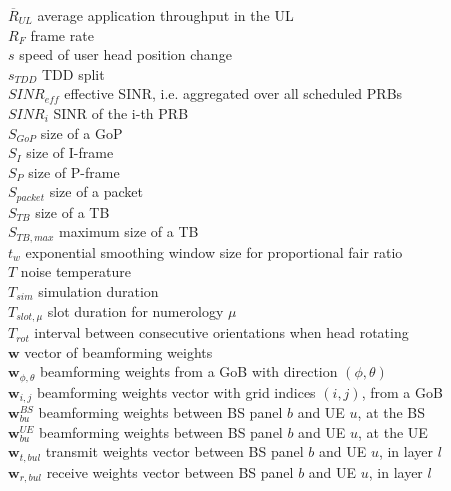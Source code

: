 $\overline{R}_{UL}$ \mytab average application throughput in the \acs{UL}\\
$R_F$ \mytab frame rate \\
$s$ \mytab speed of user head position change \\
$s_{TDD}$ \mytab \acs{TDD} split \\
$SINR_{eff}$ \mytab effective \acs{SINR}, i.e. aggregated over all scheduled PRBs \\
$SINR_i$ \mytab SINR of the i-th \acs{PRB} \\
$S_{GoP}$ \mytab size of a \acs{GoP}\\
$S_I$ \mytab size of I-frame\\
$S_P$ \mytab size of P-frame\\
$S_{packet}$ \mytab size of a packet\\
$S_{TB}$ \mytab size of a \acs{TB}\\
$S_{TB, max}$ \mytab maximum size of a \acs{TB}\\
$t_w$ \mytab exponential smoothing window size for proportional fair ratio \\
$T$ \mytab noise temperature\\
$T_{sim}$ \mytab simulation duration\\
$T_{slot, \mu}$ \mytab slot duration for numerology $\mu$\\
$T_{rot}$ \mytab interval between consecutive orientations when head rotating\\
$\bm{w}$ \mytab vector of beamforming weights \\
$\bm{w}_{\phi, \theta}$ \mytab beamforming weights from a GoB with direction $(\phi, \theta)$ \\
$\bm{w}_{i,j}$ \mytab beamforming weights vector with grid indices $(i,j)$, from a GoB\\
$\bm{w}^{BS}_{bu}$ \mytab beamforming weights between BS panel $b$ and UE $u$, at the BS \\
$\bm{w}^{UE}_{bu}$ \mytab beamforming weights between BS panel $b$ and UE $u$, at the UE \\
$\bm{w}_{t, bul}$ \mytab transmit weights vector between BS panel $b$ and UE $u$, in layer $l$\\
$\bm{w}_{r, bul}$ \mytab receive weights vector between BS panel $b$ and UE $u$, in layer $l$\\

